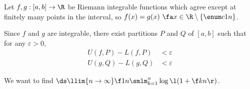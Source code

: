 \documentclass[a4paper]{article}
\begin{document}

Let $f, g : [a, b] \to \R$ be Riemann integrable functions which agree except at finitely many points in the interval, so $f(x) = g(x) \ \fa x \in \R \setminus \{\enum c1n\}$.

Since $f$ and $g$ are integrable, there exist partitions $P$ and $Q$ of $[a,b]$ such that for any $\varepsilon > 0$, \begin{align*}
U(f, P) - L(f, P) &< \varepsilon\\[1ex]
U(g, Q) - L(g, Q) &< \varepsilon
\end{align*}




We want to find $\ds \llim{n \to \infty} \f1n \smlm_{k=1}^n \log \l( 1 + \f kn \r)$.

\end{document}
